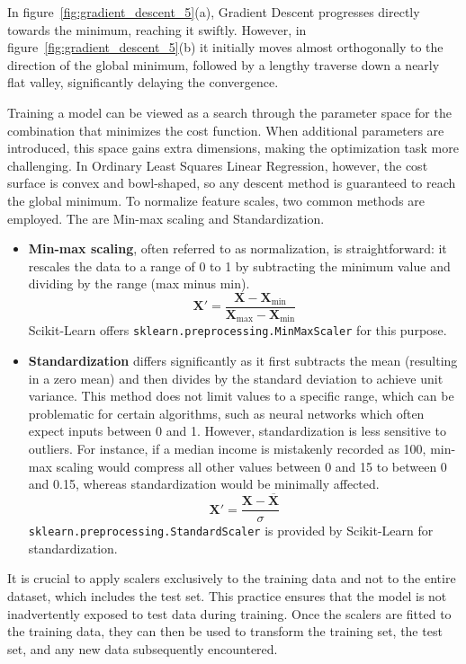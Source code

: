 \documentclass[12pt,letter]{article}
\begin{document}
In figure~\ref{fig:gradient_descent_5}(a), Gradient Descent progresses directly towards the minimum, reaching it swiftly. However, in figure~\ref{fig:gradient_descent_5}(b) it initially moves almost orthogonally to the direction of the global minimum, followed by a lengthy traverse down a nearly flat valley, significantly delaying the convergence.

Training a model can be viewed as a search through the parameter space for the combination that minimizes the cost function. When additional parameters are introduced, this space gains extra dimensions, making the optimization task more challenging. In Ordinary Least Squares Linear Regression, however, the cost surface is convex and bowl-shaped, so any descent method is guaranteed to reach the global minimum. To normalize feature scales, two common methods are employed. The are Min-max scaling and Standardization. 
\begin{itemize}
\item \textbf{Min-max scaling}, often referred to as normalization, is straightforward: it rescales the data to a range of 0 to 1 by subtracting the minimum value and dividing by the range (max minus min).
\begin{equation}
\textbf{X}' = \frac{\textbf{X} - \textbf{X}_\text{min}}{\textbf{X}_\text{max} - \textbf{X}_\text{min}}
\end{equation}
Scikit-Learn offers \texttt{sklearn.preprocessing.MinMaxScaler} for this purpose.
\item \textbf{Standardization} differs significantly as it first subtracts the mean (resulting in a zero mean) and then divides by the standard deviation to achieve unit variance. This method does not limit values to a specific range, which can be problematic for certain algorithms, such as neural networks which often expect inputs between 0 and 1. However, standardization is less sensitive to outliers. For instance, if a median income is mistakenly recorded as 100, min-max scaling would compress all other values between 0 and 15 to between 0 and 0.15, whereas standardization would be minimally affected.
\begin{equation}
\textbf{X}' = \frac{\textbf{X} - \overline{\textbf{X}}}{\sigma}
\end{equation}
\texttt{sklearn.preprocessing.StandardScaler} is provided by Scikit-Learn for standardization.
\end{itemize}

\begin{mdframed}[middlelinewidth=0.5mm]
\begin{center}
\end{center}
It is crucial to apply scalers exclusively to the training data and not to the entire dataset, which includes the test set. This practice ensures that the model is not inadvertently exposed to test data during training. Once the scalers are fitted to the training data, they can then be used to transform the training set, the test set, and any new data subsequently encountered.
\end{mdframed}
\end{document}
